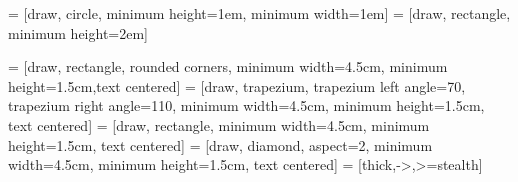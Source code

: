 




\usepackage{amsmath,amsfonts,amssymb,amsthm}

\usepackage{booktabs}
\usepackage{graphicx}

\usepackage[justification=centering]{caption}

\usepackage{calc}

\usepackage{tikz}
\usetikzlibrary{positioning}
\usetikzlibrary{calc}

 = [draw, circle, minimum height=1em, minimum width=1em]
 = [draw, rectangle, minimum height=2em]

\usetikzlibrary{shapes.geometric, arrows}

 = [draw, rectangle, rounded corners, minimum width=4.5cm, minimum height=1.5cm,text centered]
 = [draw, trapezium, trapezium left angle=70, trapezium right angle=110, minimum width=4.5cm, minimum height=1.5cm, text centered]
 = [draw, rectangle, minimum width=4.5cm, minimum height=1.5cm, text centered]
 = [draw, diamond, aspect=2, minimum width=4.5cm, minimum height=1.5cm, text centered]
 = [thick,->,>=stealth]


\newcommand{\troom}{\ensuremath{\hat{T}_{\mathrm{off}}}}
\newcommand{\hroom}{\ensuremath{\hat{h}_{\mathrm{off}}}}
\newcommand{\xa}{\ensuremath{\hat{x}_a}}

\newcommand{\irr}{\ensuremath{I}}
\newcommand{\irrnat}{\ensuremath{\hat{\irr}_{\mathrm{nat}}}}
\newcommand{\irrart}{\ensuremath{\irr_{\mathrm{art}}}}
\newcommand{\pho}{\ensuremath{A}}
\newcommand{\pow}{\ensuremath{P}}

\newcommand{\irrdelta}{\ensuremath{\irr_{\Delta}}}

\newcommand{\maxirrart}{\ensuremath{\irrart^{\max}}}
\newcommand{\maxpow}{\ensuremath{\pow^{\max}}}

\newcommand{\accirr}{\ensuremath{\irr_{\Sigma}}}
\newcommand{\accpho}{\ensuremath{\pho_{\Sigma}}}
\newcommand{\accpow}{\ensuremath{\pow_{\Sigma}}}

\newcommand{\optaccirr}{\ensuremath{\accirr^{\mathrm{opt}}}}
\newcommand{\maxaccpho}{\ensuremath{\accpho^{\max}}}
\newcommand{\minaccpho}{\ensuremath{\accpho^{\min}}}
\newcommand{\maxaccpow}{\ensuremath{\accpow^{\max}}}